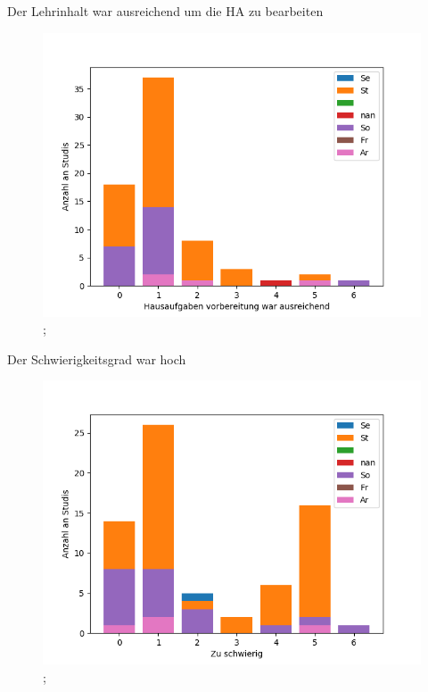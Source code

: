 \documentclass[10pt]{beamer}
\begin{document}
\begin{frame}[fragile]{Der Lehrinhalt war ausreichend um die HA zu bearbeiten} 
 \begin{figure}
 \includegraphics[width= 0.9\linewidth]{./PDFcreater/Plots/SolidEdge/Der+Lehrinhalt+war+ausreichend+um+die+HA+zu+bearbeiten.png};
 \end{figure}
 \end{frame}
\begin{frame}[fragile]{Der Schwierigkeitsgrad war hoch} 
 \begin{figure}
 \includegraphics[width= 0.9\linewidth]{./PDFcreater/Plots/SolidEdge/Der+Schwierigkeitsgrad+war+hoch.png};
 \end{figure}
 \end{frame}
\end{document}
